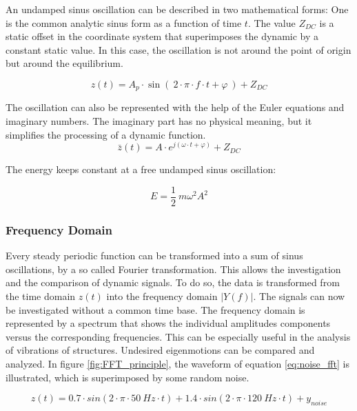 An undamped sinus oscillation can be described in two mathematical forms: One is the common analytic sinus form as a function of time $t$. The value $Z_{DC}$ is a static offset in the coordinate system that superimposes the dynamic by a constant static value. In this case, the oscillation is not around the point of origin but around the equilibrium.

\begin{equation}
z(t)=A_{p}\cdot \sin(~2\cdot\pi \cdot f \cdot t + \varphi~) +Z_{DC}
\end{equation}  

The oscillation can also be represented with the help of the Euler equations and imaginary numbers. The imaginary part has no physical meaning, but it simplifies the processing of a dynamic function.
\begin{equation}
\bar{z}(t)=A\cdot e^{j(\omega\cdot t +\varphi)} + Z_{DC}
\end{equation}

The energy keeps constant at a free undamped sinus oscillation:

\begin{equation} \label{eq:Energy_oscillation}
E=\frac{1}{2}~m\omega^2 A^2
\end{equation}



\subsubsection{Frequency Domain} \label{chap:frequency_domain}
Every steady periodic function can be transformed into a sum of sinus oscillations, by a so called Fourier transformation. This allows the investigation and the comparison of dynamic signals. To do so, the data is transformed from the time domain $z(t)$ into the frequency domain $|Y(f)|$. The signals can now be investigated without a common time base. The frequency domain is represented by a spectrum that shows the individual amplitudes components versus the corresponding frequencies. This can be especially useful in the analysis of vibrations of structures. Undesired eigenmotions can be compared and analyzed. In figure \ref{fig:FFT_principle}, the waveform of equation \ref{eq:noise_fft} is illustrated, which is superimposed by some random noise.

\begin{equation} \label{eq:noise_fft}
z(t)= 0.7\cdot sin(2\cdot \pi\cdot 50~Hz \cdot t) + 1.4\cdot sin(2\cdot\pi\cdot 120~Hz \cdot t) + y_{noise}
\end{equation}


